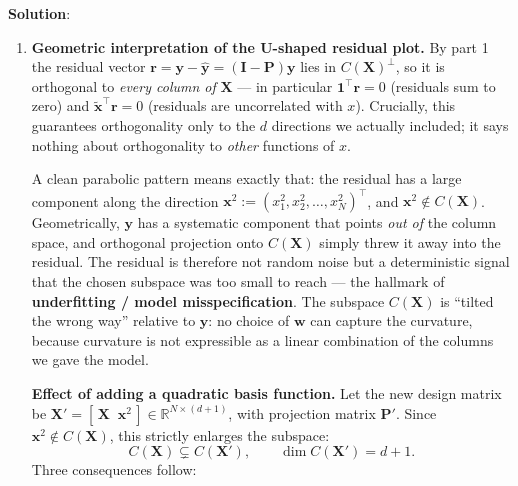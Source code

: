 \documentclass[submit]{../harvardml}
\newenvironment{solution}{
    \vspace{2mm}
    \color{blue}\noindent\textbf{Solution}:
}{}
\begin{document}
\begin{solution}
\begin{enumerate}
\item
\textbf{Geometric interpretation of the U-shaped residual plot.}
By part 1 the residual vector $\mathbf r = \mathbf y - \hat{\mathbf y} =
(\mathbf I - \mathbf P)\mathbf y$ lies in $C(\mathbf X)^\perp$, so it is
orthogonal to \emph{every column of} $\mathbf X$ --- in particular
$\mathbf 1^\top \mathbf r = 0$ (residuals sum to zero) and
$\tilde{\mathbf x}^\top\mathbf r = 0$ (residuals are uncorrelated with $x$).
Crucially, this guarantees orthogonality only to the $d$ directions we actually
included; it says nothing about orthogonality to \emph{other} functions of $x$.

A clean parabolic pattern means exactly that: the residual has a large
component along the direction
$\mathbf x^2 := (x_1^2, x_2^2, \ldots, x_N^2)^\top$, and $\mathbf x^2 \notin
C(\mathbf X)$. Geometrically, $\mathbf y$ has a systematic component that points
\emph{out of} the column space, and orthogonal projection onto $C(\mathbf X)$
simply threw it away into the residual. The residual is therefore not random
noise but a deterministic signal that the chosen subspace was too small to
reach --- the hallmark of \textbf{underfitting / model misspecification}. The
subspace $C(\mathbf X)$ is ``tilted the wrong way'' relative to $\mathbf y$: no
choice of $\mathbf w$ can capture the curvature, because curvature is not
expressible as a linear combination of the columns we gave the model.

\textbf{Effect of adding a quadratic basis function.}
Let the new design matrix be $\mathbf X' = [\,\mathbf X \;\; \mathbf x^2\,]
\in \mathbb{R}^{N\times(d+1)}$, with projection matrix $\mathbf P'$. Since
$\mathbf x^2 \notin C(\mathbf X)$, this strictly enlarges the subspace:
\[
  C(\mathbf X) \subsetneq C(\mathbf X'), \qquad \dim C(\mathbf X') = d+1 .
\]
Three consequences follow:


\end{enumerate}
\end{solution}
\end{document}
